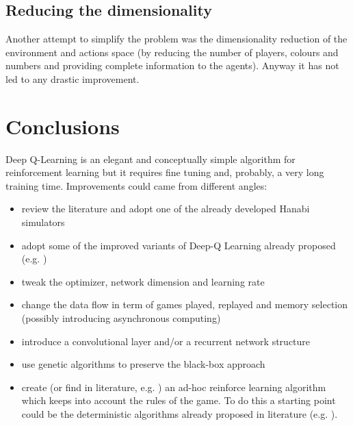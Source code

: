\documentclass[]{article}
\begin{document}
\subsection{Reducing the dimensionality}
Another attempt to simplify the problem was the dimensionality reduction of the environment and actions space (by reducing the number of players, colours and numbers and providing complete information to the agents).
Anyway it has not led to any drastic improvement.

\section{Conclusions}
Deep Q-Learning is an elegant and conceptually simple algorithm for reinforcement learning but it requires fine tuning and, probably, a very long training time.
Improvements could came from different angles:
\begin{itemize}
	\item review the literature and adopt one of the already developed Hanabi simulators \cite{BARD2020103216}
	\item adopt some of the improved variants of Deep-Q Learning already proposed (e.g. \cite{vanhasselt2015deep})
	\item tweak the optimizer, network dimension and learning rate
	\item change the data flow in term of games played, replayed and memory selection (possibly introducing asynchronous computing)
	\item introduce a convolutional layer and/or a recurrent network structure
	\item use genetic algorithms to preserve the black-box approach
	\item create (or find in literature, e.g. \cite{Lerer2019}) an ad-hoc reinforce learning algorithm which keeps into account the rules of the game. To do this a starting point could be the deterministic algorithms already proposed in literature (e.g. \cite{Cox2015}).
\end{itemize}
\end{document}

